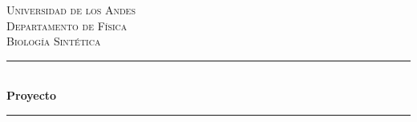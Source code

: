 \documentclass[12pt]{article}
\begin{document}
\begin{titlepage}

\newcommand{\HRule}{\rule{\linewidth}{0.5mm}} %

\center %
 

\textsc{\LARGE Universidad de los Andes}\\[1.5cm] %
\textsc{\Large Departamento de F\'isica}\\[0.5cm] %
\textsc{\large Biolog\'ia Sint\'etica}\\[0.5cm] %


\HRule \\[0.4cm]
{ \huge \bfseries Proyecto}\\[0.4cm] %
\HRule \\[1.5cm]
 





\end{titlepage}
\end{document}
